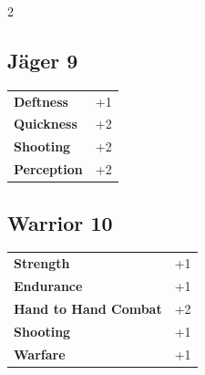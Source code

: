 \begin{multicols}{2}
\begin{tcolorbox}
\end{tcolorbox}

\begin{tcolorbox}
    \subsection*{Jäger \hfill \small{9 }}
    \tcblower




\begin{tabular}{@{}ll@{}}
    \textbf{Deftness} & +1\\
    \textbf{Quickness} & +2\\
    \textbf{Shooting} & +2\\
    \textbf{Perception} & +2\\
\end{tabular}


\end{tcolorbox}

\begin{tcolorbox}
    \subsection*{Warrior \hfill \small{10 }}
    \tcblower




\begin{tabular}{@{}ll@{}}
    \textbf{Strength} & +1\\
    \textbf{Endurance} & +1\\
    \textbf{Hand to Hand Combat} & +2\\
    \textbf{Shooting} & +1\\
    \textbf{Warfare} & +1\\
\end{tabular}


\end{tcolorbox}


\end{multicols}
